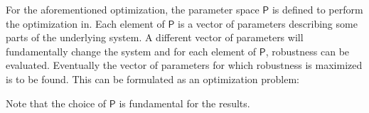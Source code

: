     For the aforementioned optimization, the parameter space $\mathsf{P}$ is defined to perform the optimization in. Each element of $\mathsf{P}$ is a vector of parameters describing some parts of the underlying system. A different vector of parameters will fundamentally change the system and for each element of $\mathsf{P}$, robustness can be evaluated. Eventually the vector of parameters for which robustness is maximized is to be found. This can be formulated as an optimization problem:

    Note that the choice of $\mathsf{P}$ is fundamental for the results. 










